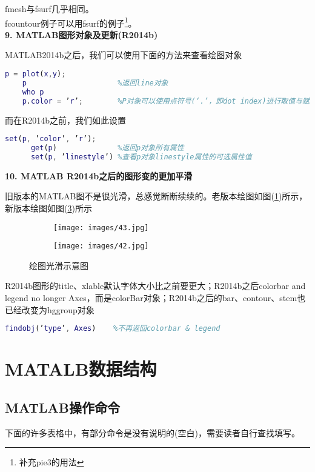     fmesh与fsurf几乎相同。\\
    fcountour例子可以用fsurf的例子\footnote{补充pie3的用法}。\\
    \textbf{9. MATLAB图形对象及更新(R2014b)}
    \par
    MATLAB2014b之后，我们可以使用下面的方法来查看绘图对象
    \begin{lstlisting}[language=Matlab]
    p = plot(x,y);
    p                     %返回line对象
    who p
    p.color = ’r’;        %P对象可以使用点符号(‘.’，即dot index)进行取值与赋值
    \end{lstlisting}
    而在R2014b之前，我们如此设置
    \begin{lstlisting}[language=Matlab]
      set(p, ’color’, ’r’);
      get(p)              %返回p对象所有属性
      set(p, ’linestyle’) %查看p对象linestyle属性的可选属性值
    \end{lstlisting}
    \textbf{10. MATLAB R2014b之后的图形变的更加平滑}
    \par
    旧版本的MATLAB图不是很光滑，总感觉断断续续的。老版本绘图如图(\ref{绘图光滑示意图1})所示，新版本绘图如图(\ref{绘图光滑示意图2})所示
    \begin{figure}[H]
    \centering
    \begin{subfigure}[b]{0.4\textwidth}
        \texttt{[image: images/43.jpg]}
        \caption{}
        \label{绘图光滑示意图1}
    \end{subfigure}
    \begin{subfigure}[b]{0.4\textwidth}
        \texttt{[image: images/42.jpg]}
        \caption{}
        \label{绘图光滑示意图2}
    \end{subfigure}
    \caption{绘图光滑示意图}
    \end{figure}
    \par
    R2014b图形的title、xlable默认字体大小比之前要更大；R2014b之后colorbar and legend no longer Axes，而是colorBar对象；R2014b之后的bar、contour、stem也已经改变为hggroup对象
    \begin{lstlisting}[language=Matlab]
      findobj(’type’, Axes)    %不再返回colorbar & legend
    \end{lstlisting}
\chapter{MATALB数据结构}
\section{MATLAB操作命令}
    \par
    下面的许多表格中，有部分命令是没有说明的(空白)，需要读者自行查找填写。
